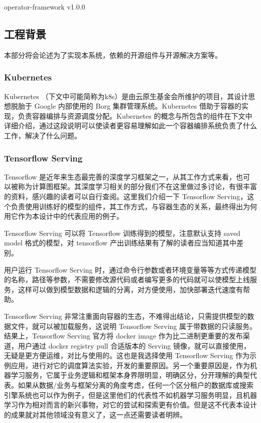 operator-framework v1.0.0

\subsection{工程背景}

本部分将会论述为了实现本系统，依赖的开源组件与开源解决方案等。

\subsubsection{Kubernetes}

Kubernetes \cite{kubernetes} （下文中可能简称为k8s）是由云原生基金会所维护的项目，其设计思想脱胎于 Google 内部使用的 Borg 集群管理系统。Kubernetes 借助于容器的实现，负责容器编排与资源调度分配。Kubernetes 的概念与所包含的组件在下文中详细介绍，通过这段说明可以使读者更容易理解如此一个容器编排系统负责了什么工作，解决了什么问题。

\subsubsection{Tensorflow Serving}

Tensorflow 是近年来生态最完善的深度学习框架之一，从其工作方式来看，也可以被称为计算图框架。其深度学习相关的部分我们不在这里做过多讨论，有很丰富的资料，感兴趣的读者可以自行查阅。这里我们介绍一下 Tensorflow Serving，这个负责使用训练好的模型的组件，其工作方式，与容器生态的关系，最终得出为何用它作为本设计中的代表应用的例子。

Tensorflow Serving 可以将 Tensorflow 训练得到的模型，注意默认支持 saved model 格式的模型，对 tensorflow 产出训练结果有了解的读者应当知道其中差别。

用户运行 Tensorflow Serving 时，通过命令行参数或者环境变量等等方式传递模型的名称，路径等参数，不需要修改源代码或者编写更多的代码就可以使模型上线服务，这样可以做到模型数据和逻辑的分离，对方便使用，加快部署迭代速度有帮助。

Tensorflow Serving 非常注重面向容器的生态，不难得出结论，只需提供模型的数据文件，就可以被加载服务，这说明 Tensorflow Serving 属于带数据的只读服务。结果上，Tensorflow Serving 官方将 docker image 作为比二进制更重要的发布渠道，用户通过 docker registry pull 合适版本的 Serving 镜像，就可以直接使用，无疑是更方便运维，对比与使用的。这也是我选择使用 Tensorflow Serving 作为示例应用，进行对它的调度算法实验，开发的重要原因。另一个重要原因是，作为机器学习服务，它属于业务逻辑和框架本身界限明显，明确区分，分开理解的典型代表。如果从数据/业务与框架分离的角度考虑，任何一个区分租户的数据库或搜索引擎系统也可以作为例子，但是这里他们的代表性不如机器学习服务明显，且机器学习作为相对而言的新兴事物，对它的尝试和探索更有价值。但是这不代表本设计的成果就对其他领域没有意义了，这一点还需要读者明辨。

